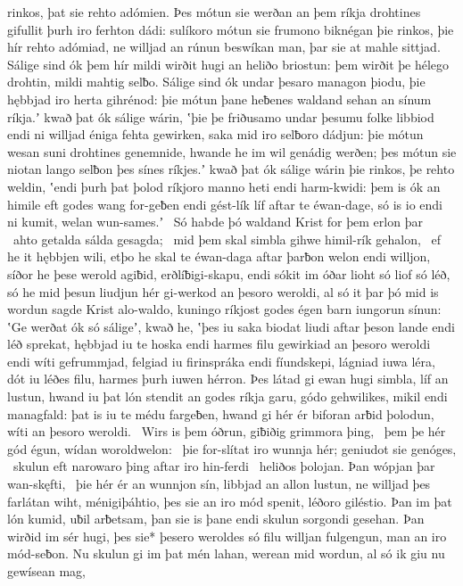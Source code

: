 rinkos, þat sie rehto adómien. Þes mótun sie werðan an þem ríkja drohtines
gifullit þurh iro ferhton dádi: sulíkoro mótun sie frumono biknégan
þie rinkos, þie hír rehto adómiad, ne willjad an rúnun beswíkan
man, þar sie at mahle sittjad. Sálige sind ók þem hír mildi wirðit
hugi an heliðo briostun: þem wirðit þe hélego drohtin,
mildi mahtig selƀo. Sálige sind ók undar þesaro managon þiodu,
þie hębbjad iro herta gihrénod: þie mótun þane heƀenes waldand
sehan an sínum ríkja.ʼ kwað þat ók sálige wárin,
ʽþie þe friðusamo undar þesumu folke libbiod endi ni willjad éniga fehta gewirken,
saka mid iro selƀoro dádjun: þie mótun wesan suni drohtines genemnide,
hwande he im wil genádig werðen; þes mótun sie niotan lango
selƀon þes sínes ríkjes.ʼ kwað þat ók sálige wárin
þie rinkos, þe rehto weldin, ʽendi þurh þat þolod ríkjoro manno
heti endi harm-kwidi: þem is ók an himile eft
godes wang for-geƀen endi gést-lík líf
aftar te éwan-dage, só is io endi ni kumit,
welan wun-sames.ʼ \hld\ Só habde þó waldand Krist
for þem erlon þar \hld\ ahto getalda
sálda gesagda; \hld\ mid þem skal simbla gihwe
himil-rík gehalon, \hld\ ef he it hębbjen wili,
etþo he skal te éwan-daga aftar þarƀon
welon endi willjon, síðor he þese werold agiƀid,
erðlíƀigi-skapu, endi sókit im óðar lioht
só liof só léð, só he mid þesun liudjun hér
gi-werkod an þesoro weroldi, al só it þar þó mid is wordun sagde
Krist alo-waldo, kuningo ríkjost
godes égen barn iungorun sínun:
ʽGe werðat ók só sáligeʼ, kwað he, ʽþes iu saka biodat
liudi aftar þeson lande endi léð sprekat,
hębbjad iu te hoska endi harmes filu
gewirkiad an þesoro weroldi endi wíti gefrummjad,
felgiad iu firinspráka endi fíundskepi,
lágniad iuwa léra, dót iu léðes filu,
harmes þurh iuwen hérron. Þes látad gi ewan hugi simbla,
líf an lustun, hwand iu þat lón stendit
an godes ríkja garu, gódo gehwilikes,
mikil endi managfald: þat is iu te médu fargeƀen,
hwand gi hér ér biforan arƀid þolodun,
wíti an þesoro weroldi. \hld\ Wirs is þem óðrun,
giƀiðig grimmora þing, \hld\ þem þe hér gód égun,
wídan woroldwelon: \hld\ þie for-slítat iro wunnja hér;
geniudot sie genóges, \hld\ skulun eft narowaro þing
aftar iro hin-ferdi \hld\ heliðos þolojan.
Þan wópjan þar wan-skęfti, \hld\ þie hér ér an wunnjon sín,
libbjad an allon lustun, ne willjad þes farlátan wiht,
ménigiþáhtio, þes sie an iro mód spenit,
léðoro giléstio. Þan im þat lón kumid,
uƀil arƀetsam, þan sie is þane endi skulun
sorgondi gesehan. Þan wirðid im sér hugi,
þes sie* þesero weroldes só filu willjan fulgengun,
man an iro mód-seƀon. Nu skulun gi im þat mén lahan,
werean mid wordun, al só ik giu nu gewísean mag,
